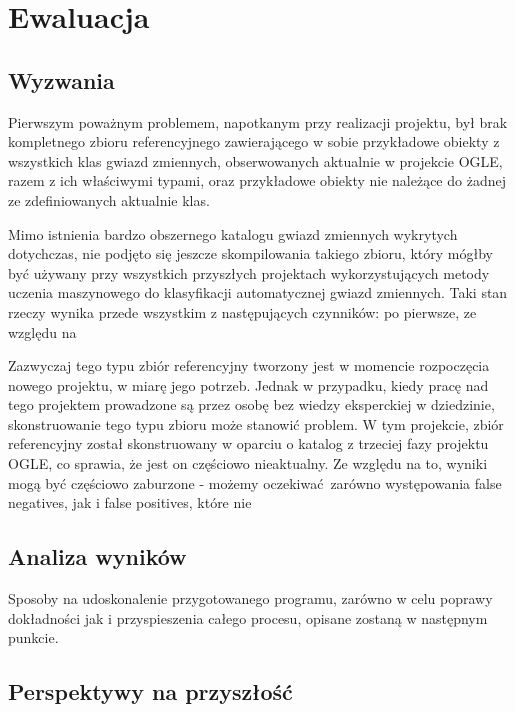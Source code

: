\documentclass{pracalicmgr}
\begin{document}
	\section{Ewaluacja}
    \subsection{Wyzwania}
    Pierwszym poważnym problemem, napotkanym przy realizacji projektu, był brak kompletnego zbioru referencyjnego zawierającego w sobie przykładowe obiekty z wszystkich klas gwiazd zmiennych, obserwowanych aktualnie w projekcie OGLE, razem z ich właściwymi typami, oraz przykładowe obiekty nie należące do żadnej ze zdefiniowanych aktualnie klas.
    
    Mimo istnienia bardzo obszernego katalogu gwiazd zmiennych wykrytych dotychczas, nie podjęto się jeszcze skompilowania takiego zbioru, który mógłby być używany przy wszystkich przyszłych projektach wykorzystujących metody uczenia maszynowego do klasyfikacji automatycznej gwiazd zmiennych. Taki stan rzeczy wynika przede wszystkim z następujących czynników: po pierwsze, ze względu na 
    
    Zazwyczaj tego typu zbiór referencyjny tworzony jest w momencie rozpoczęcia nowego projektu, w miarę jego potrzeb. Jednak w przypadku, kiedy pracę nad tego projektem prowadzone są przez osobę bez wiedzy eksperckiej w dziedzinie, skonstruowanie tego typu zbioru może stanowić problem. W tym projekcie, zbiór referencyjny został skonstruowany w oparciu o katalog z trzeciej fazy projektu OGLE, co sprawia, że jest on częściowo nieaktualny. Ze względu na to, wyniki mogą być częściowo zaburzone - możemy oczekiwać zarówno występowania false negatives, jak i false positives, które nie 
    
    \subsection{Analiza wyników}
    
    
    Sposoby na udoskonalenie przygotowanego programu, zarówno w celu poprawy dokładności jak i przyspieszenia całego procesu, opisane zostaną w następnym punkcie.
    \subsection{Perspektywy na przyszłość}
    
\end{document}
